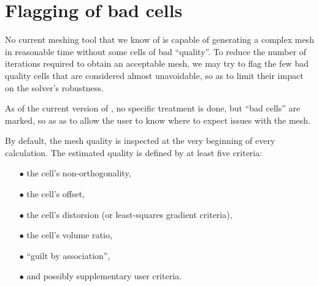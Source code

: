 
%
%
%
%


\nopagebreak

\section*{Flagging of bad cells\label{sec:bad_cells}}

No current meshing tool that we know of is capable of generating a complex mesh
in reasonable time without some cells of bad ``quality''.
To reduce the number of iterations required to obtain an acceptable mesh, we may
try to flag the few bad quality cells that are considered almost unavoidable, so
as to limit their impact on the solver's robustness.

As of the current version of \CS, no specific treatment is done, but ``bad cells''
are marked, so as as to allow the user to know where to expect issues with the mesh.

By default, the mesh quality is inspected at the very beginning of every
calculation. The estimated quality is defined by at least five criteria:

\begin{itemize}
\item[$\bullet$] the cell's non-orthogonality,
\item[$\bullet$] the cell's offset,
\item[$\bullet$] the cell's distorsion (or least-squares gradient criteria),
\item[$\bullet$] the cell's volume ratio,
\item[$\bullet$] ``guilt by association'',
\item[$\bullet$] and possibly supplementary user criteria.
\end{itemize}

